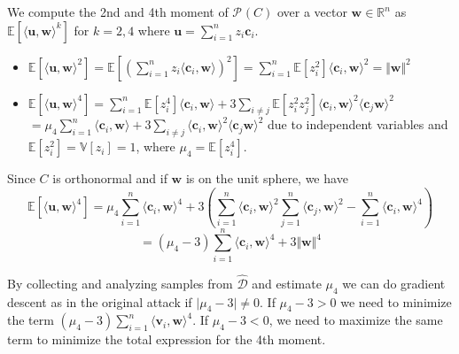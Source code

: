\documentclass[12 pt]{article}        	%
\newcommand{\PP}[2][]{\mathcal{P}_{#1}(\mat{#2})}
\newcommand{\mat}[1]{\mathit{#1}}
\renewcommand{\vec}[1]{\mathbf{#1}}
\newcommand{\bb}[1]{\mathbb{#1}}
\newcommand{\dgdi}{\widehat{\mathcal{D}}}
\renewcommand{\dot}[2]{\langle \vec{#1}, \vec{#2} \rangle}
\begin{document}
We compute the 2nd and 4th moment of $\PP{C}$ over a vector $\vec{w} \in \bb{R}^n$ as $\bb{E}[\langle \vec{u}, \vec{w} \rangle ^k]$ for $k=2,4$ where $\vec{u} = \sum_{i=1}^{n}z_i \vec{c}_i.$ 
\begin{itemize}
    \item $\bb{E}[\langle \vec{u}, \vec{w} \rangle ^2] = \bb{E}[(\sum_{i=1}^{n} z_i \langle \vec{c}_i, \vec{w} \rangle )^2] = \sum_{i=1}^{n}\bb{E}[z_i^2]\langle \vec{c}_i, \vec{w} \rangle^2 = \Vert \vec{w} \Vert ^2$
    \item $\bb{E}[\dot{u}{w} ^4] = \sum_{i=1}^{n}\bb{E}[z_i ^4] \langle \vec{c}_i, \vec{w} \rangle  + 3\sum_{i \neq j} \bb{E}[z_i^2 z_j^2] \langle \vec{c}_i, \vec{w} \rangle ^2 \langle \vec{c}_j \vec{w} \rangle^2$ \\
        $= \mu_4 \sum_{i=1}^{n} \langle \vec{c}_i, \vec{w} \rangle + 3\sum_{i \neq j} \langle \vec{c}_i, \vec{w} \rangle ^2 \langle \vec{c}_j \vec{w} \rangle^2$
        due to independent variables and $\bb{E}[z_i ^2] = \bb{V}[z_i] = 1$, where $\mu_4 = \bb{E}[z_i ^4]$.
\end{itemize}
Since $\mat{C}$ is orthonormal and if $\vec{w}$ is on the unit sphere, we have 
\[\bb{E}[\dot{u}{w} ^4] = \mu_4 \sum_{i=1}^{n} \langle \vec{c}_i, \vec{w} \rangle ^4 + 3(\sum_{i=1}^{n} \langle \vec{c}_i, \vec{w} \rangle^2 \sum_{j=1}^{n} \langle \vec{c}_j, \vec{w} \rangle^2 - \sum_{i=1}^{n} \langle \vec{c}_i, \vec{w} \rangle ^4)\]
\[= (\mu_4 - 3)\sum_{i=1}^{n}\langle \vec{c}_i, \vec{w} \rangle^4 + 3 \Vert \vec{w} \Vert ^4\]

By collecting and analyzing samples from $\dgdi$ and estimate $\mu_4$ we can do gradient descent as in the original attack if $\lvert \mu_4 - 3 \rvert \neq 0$.
If $\mu_4 - 3 > 0$ we need to minimize the term $(\mu_4 - 3) \sum_{i=1}^{n} \langle \vec{v}_i, \vec{w} \rangle ^4$. If $\mu_4 - 3 < 0$, we need to maximize the same term to minimize the total expression for the 4th moment.
\end{document}
